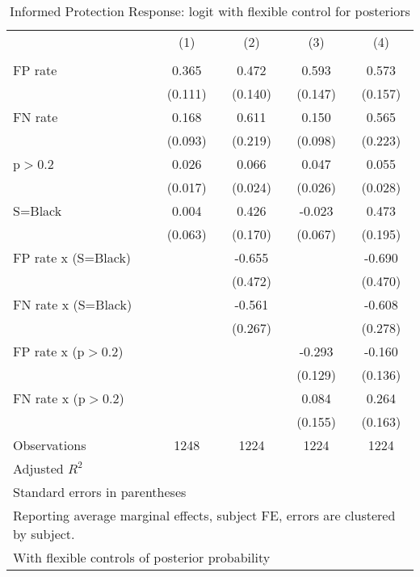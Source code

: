 \begin{table}[htbp]\centering
\caption{Informed Protection Response: logit with flexible control for posteriors}
\begin{tabular}{l*{4}{c}}
\hline\hline
                &\multicolumn{1}{c}{(1)}&\multicolumn{1}{c}{(2)}&\multicolumn{1}{c}{(3)}&\multicolumn{1}{c}{(4)}\\
                &\multicolumn{1}{c}{}&\multicolumn{1}{c}{}&\multicolumn{1}{c}{}&\multicolumn{1}{c}{}\\
\hline
FP rate         &    0.365&    0.472&    0.593&    0.573\\
                &  (0.111)&  (0.140)&  (0.147)&  (0.157)\\
FN rate         &    0.168&    0.611&    0.150&    0.565\\
                &  (0.093)&  (0.219)&  (0.098)&  (0.223)\\
p$>$0.2         &    0.026&    0.066&    0.047&    0.055\\
                &  (0.017)&  (0.024)&  (0.026)&  (0.028)\\
S=Black         &    0.004&    0.426&   -0.023&    0.473\\
                &  (0.063)&  (0.170)&  (0.067)&  (0.195)\\
FP rate x (S=Black)&         &   -0.655&         &   -0.690\\
                &         &  (0.472)&         &  (0.470)\\
FN rate x (S=Black)&         &   -0.561&         &   -0.608\\
                &         &  (0.267)&         &  (0.278)\\
FP rate x (p$>$0.2)&         &         &   -0.293&   -0.160\\
                &         &         &  (0.129)&  (0.136)\\
FN rate x (p$>$0.2)&         &         &    0.084&    0.264\\
                &         &         &  (0.155)&  (0.163)\\
\hline
Observations    &     1248&     1224&     1224&     1224\\
Adjusted \(R^{2}\)&         &         &         &         \\
\hline\hline
\multicolumn{5}{l}{\footnotesize Standard errors in parentheses}\\
\multicolumn{5}{l}{\footnotesize Reporting average marginal effects, subject FE, errors are clustered by subject.}\\
\multicolumn{5}{l}{\footnotesize With flexible controls of posterior probability}\\
\end{tabular}
\end{table}
